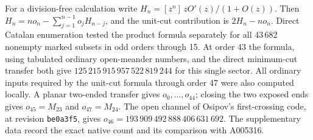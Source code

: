 For a division-free calculation write \(H_n=[z^n]\,zO'(z)/(1+O(z))\).
Then \(H_n=n o_n-\sum_{j=1}^{n-1}o_jH_{n-j}\), and the unit-cut
contribution is \(2H_n-n o_n\). Direct Catalan enumeration tested the
product formula separately for all 43\,682 nonempty marked subsets in odd
orders through 15. At order 43 the formula, using tabulated ordinary
open-meander numbers, and the direct minimum-cut transfer both give
\(125\,215\,915\,957\,522\,819\,244\) for this single sector.
All ordinary inputs required by the unit-cut formula through order 47
were also computed locally. A planar two-ended transfer gives
\(o_0,\ldots,o_{44}\); closing the two exposed ends gives
\(o_{45}=M_{23}\) and \(o_{47}=M_{24}\). The open channel of Osipov's
first-crossing code, at revision \texttt{be0a3f5}, gives
\(o_{46}=193\,909\,492\,888\,406\,631\,692\). The supplementary data
record the exact native count and its comparison with A005316.
